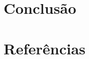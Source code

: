 \documentclass[a4paper, 12pt]{article}
\begin{document}
\begin{multicols}{2}
		\section{Conclusão} \label{sec:conclusao}
		
		\section{Referências}
		
	\end{multicols}
\end{document}
